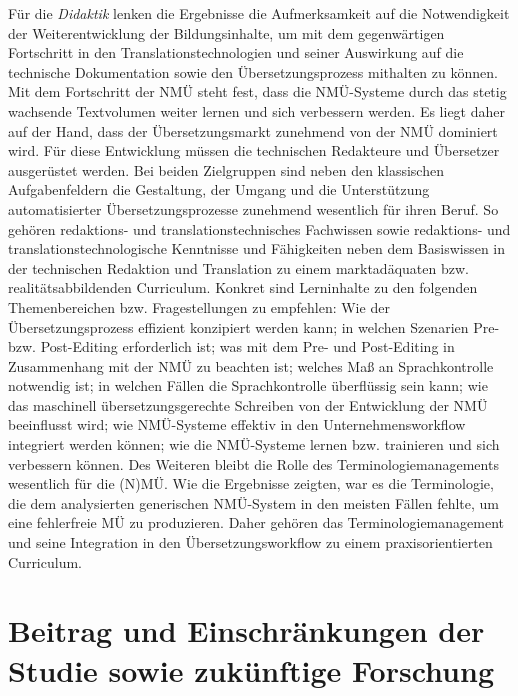 Für die \textit{Didaktik} lenken die Ergebnisse die Aufmerksamkeit auf die Notwendigkeit der Weiterentwicklung der Bildungsinhalte, um mit dem gegenwärtigen Fortschritt in den Translationstechnologien und seiner Auswirkung auf die technische Dokumentation sowie den Übersetzungsprozess mithalten zu können. Mit dem Fortschritt der NMÜ steht fest, dass die NMÜ-Systeme durch das stetig wachsende Textvolumen weiter lernen und sich verbessern werden. Es liegt daher auf der Hand, dass der Übersetzungsmarkt zunehmend von der NMÜ dominiert wird. Für diese Entwicklung müssen die technischen Redakteure und Übersetzer ausgerüstet werden. Bei beiden Zielgruppen sind neben den klassischen Aufgabenfeldern die Gestaltung, der Umgang und die Unterstützung automatisierter Übersetzungsprozesse zunehmend wesentlich für ihren Beruf. So gehören redaktions- und translationstechnisches Fachwissen sowie redaktions- und translationstechnologische Kenntnisse und Fähigkeiten neben dem Basiswissen in der technischen Redaktion und Translation zu einem marktadäquaten bzw. realitätsabbildenden Curriculum. Konkret sind Lerninhalte zu den folgenden Themenbereichen bzw. Fragestellungen zu empfehlen: Wie der Übersetzungsprozess effizient konzipiert werden kann; in welchen Szenarien Pre- bzw. Post-Editing erforderlich ist; was mit dem Pre- und Post-Editing in Zusammenhang mit der NMÜ zu beachten ist; welches Maß an Sprachkontrolle notwendig ist; in welchen Fällen die Sprachkontrolle überflüssig sein kann; wie das maschinell übersetzungsgerechte Schreiben von der Entwicklung der NMÜ beeinflusst wird; wie NMÜ-Systeme effektiv in den Unternehmensworkflow integriert werden können; wie die NMÜ-Systeme lernen bzw. trainieren und sich verbessern können. Des Weiteren bleibt die Rolle des Terminologiemanagements wesentlich für die (N)MÜ. Wie die Ergebnisse zeigten, war es die Terminologie, die dem analysierten generischen NMÜ-System in den meisten Fällen fehlte, um eine fehlerfreie MÜ zu produzieren. Daher gehören das Terminologiemanagement und seine Integration in den Übersetzungsworkflow zu einem praxisorientierten Curriculum.

\section{\label{sec:7.3}Beitrag und Einschränkungen der Studie sowie zukünftige Forschung}


